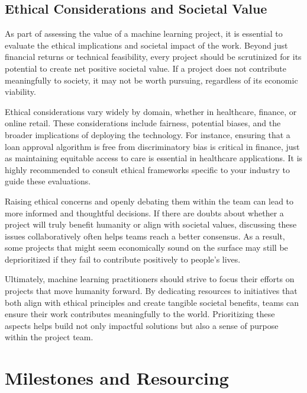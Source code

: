 \documentclass[12pt,openany]{book}
\begin{document}
\subsection{Ethical Considerations and Societal Value}

As part of assessing the value of a machine learning project, it is essential to evaluate the ethical implications and societal impact of the work. Beyond just financial returns or technical feasibility, every project should be scrutinized for its potential to create net positive societal value. If a project does not contribute meaningfully to society, it may not be worth pursuing, regardless of its economic viability. \newline

Ethical considerations vary widely by domain, whether in healthcare, finance, or online retail. These considerations include fairness, potential biases, and the broader implications of deploying the technology. For instance, ensuring that a loan approval algorithm is free from discriminatory bias is critical in finance, just as maintaining equitable access to care is essential in healthcare applications. It is highly recommended to consult ethical frameworks specific to your industry to guide these evaluations. \newline

Raising ethical concerns and openly debating them within the team can lead to more informed and thoughtful decisions. If there are doubts about whether a project will truly benefit humanity or align with societal values, discussing these issues collaboratively often helps teams reach a better consensus. As a result, some projects that might seem economically sound on the surface may still be deprioritized if they fail to contribute positively to people's lives. \newline

Ultimately, machine learning practitioners should strive to focus their efforts on projects that move humanity forward. By dedicating resources to initiatives that both align with ethical principles and create tangible societal benefits, teams can ensure their work contributes meaningfully to the world. Prioritizing these aspects helps build not only impactful solutions but also a sense of purpose within the project team. \newline


\section{Milestones and Resourcing}
\end{document}
